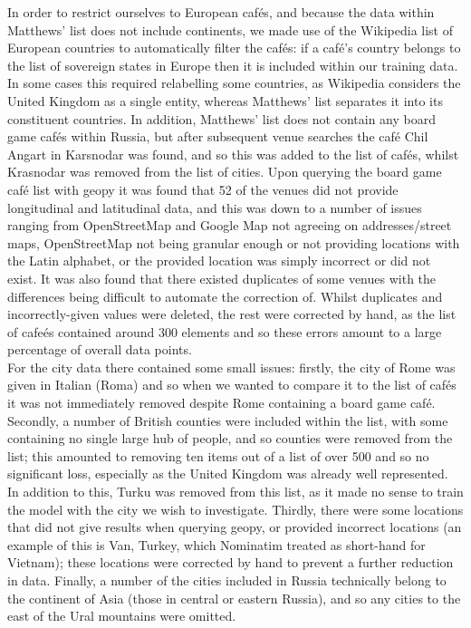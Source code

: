 \documentclass{article}
\begin{document}
    In order to restrict ourselves to European caf\'es, and because the data within Matthews' list does not include continents, we made use of the Wikipedia list of European countries \cite{WikiEU} to automatically filter the caf\'es: if a caf\'e's country belongs to the list of sovereign states in Europe then it is included within our training data.
    In some cases this required relabelling some countries, as Wikipedia considers the United Kingdom as a single entity, whereas Matthews' list separates it into its constituent countries.
    In addition, Matthews' list does not contain any board game caf\'es within Russia, but after subsequent venue searches the caf\'e Chil Angart in Karsnodar was found, and so this was added to the list of caf\'es, whilst Krasnodar was removed from the list of cities.
    Upon querying the board game caf\'e list with geopy it was found that 52 of the venues did not provide longitudinal and latitudinal data, and this was down to a number of issues ranging from OpenStreetMap and Google Map not agreeing on addresses/street maps, OpenStreetMap not being granular enough or not providing locations with the Latin alphabet, or the provided location was simply incorrect or did not exist.
    It was also found that there existed duplicates of some venues with the differences being difficult to automate the correction of.
    Whilst duplicates and incorrectly-given values were deleted, the rest were corrected by hand, as the list of cafe\'es contained around 300 elements and so these errors amount to a large percentage of overall data points. \\

    For the city data there contained some small issues: firstly, the city of Rome was given in Italian (Roma) and so when we wanted to compare it to the list of caf\'es it was not immediately removed despite Rome containing a board game caf\'e. 
    Secondly, a number of British counties were included within the list, with some containing no single large hub of people, and so counties were removed from the list; this amounted to removing ten items out of a list of over 500 and so no significant loss, especially as the United Kingdom was already well represented.
    In addition to this, Turku was removed from this list, as it made no sense to train the model with the city we wish to investigate.
    Thirdly, there were some locations that did not give results when querying geopy, or provided incorrect locations (an example of this is Van, Turkey, which Nominatim treated as short-hand for Vietnam); these locations were corrected by hand to prevent a further reduction in data.
    Finally, a number of the cities included in Russia technically belong to the continent of Asia (those in central or eastern Russia), and so any cities to the east of the Ural mountains were omitted.\\
\end{document}
